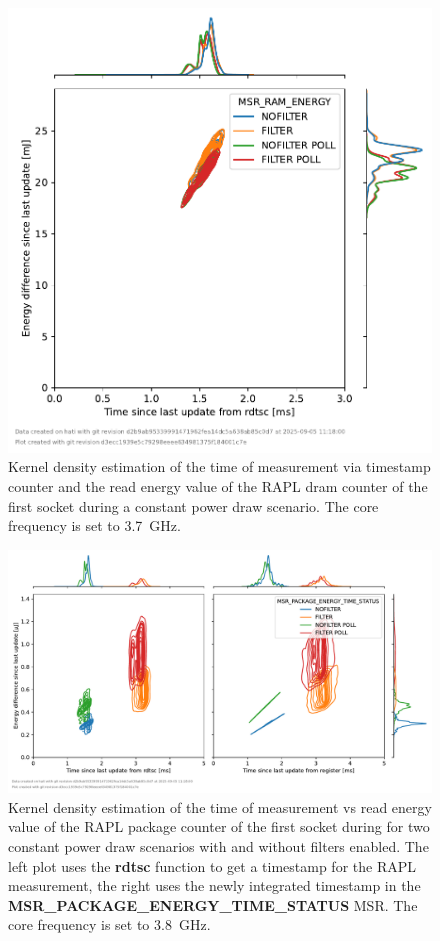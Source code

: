 \begin{figure}[]
    \centering
    \includegraphics[width=0.54\columnwidth]{fig/rapl-update-intervals/MSR_RAM_ENERGY_3700000.pdf}
    \caption{Kernel density estimation of the time of measurement via timestamp counter and the read energy value of the RAPL dram counter of the first socket during a constant power draw scenario.
    The core frequency is set to \SI{3.7}{\GHz}.}
\end{figure}

\clearpage
\begin{figure}[]
    \centering
    \includegraphics[width=\columnwidth]{fig/rapl-update-intervals/MSR_PACKAGE_ENERGY_TIME_STATUS_3800000.pdf}
    \caption{Kernel density estimation of the time of measurement vs read energy value of the RAPL package counter of the first socket during for two constant power draw scenarios with and without filters enabled.
    The left plot uses the \textbf{rdtsc} function to get a timestamp for the RAPL measurement, the right uses the newly integrated timestamp in the \textbf{MSR\_PACKAGE\_ENERGY\_TIME\_STATUS} MSR.
    The core frequency is set to \SI{3.8}{\GHz}.}
\end{figure}

